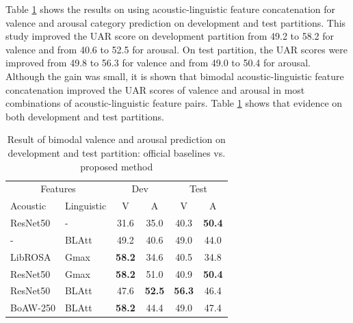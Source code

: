 Table \ref{tab:bimodal_result} shows the results on using acoustic-linguistic
feature concatenation for valence and arousal category prediction on
development and test partitions. This study improved the UAR score on
development partition from 49.2 to 58.2 for valence and from 40.6 to 52.5 for
arousal. On test partition, the UAR scores were improved from 49.8 to 56.3 for
valence and from 49.0 to 50.4 for arousal. Although the gain was small, it is
shown that bimodal acoustic-linguistic feature concatenation improved the UAR
scores of valence and arousal in most combinations of acoustic-linguistic
feature pairs. Table \ref{tab:bimodal_result} shows that evidence on both
development and test partitions.

\begin{table}
  \caption{Result of bimodal valence and arousal prediction on development and test partition: official baselines vs. proposed method}
  \label{tab:bimodal_result}
  \begin{center}
  \begin{tabular}{l l c c c c}
    \hline
\multicolumn{2}{c}{Features} & \multicolumn{2}{c}{Dev} &
\multicolumn{2}{c}{Test} \\
Acoustic  & Linguistic  & V & A & V & A \\
\hline \hline
ResNet50 \cite{Schuller}  & - & 31.6  & 35.0  & 40.3  & \textbf{50.4}\\
- & BLAtt \cite{Schuller} & 49.2  & 40.6  & 49.0  & 44.0 \\
LibROSA & Gmax  & \textbf{58.2} & 34.6  & 40.5  & 34.8 \\
ResNet50  & Gmax  & \textbf{58.2} & 51.0  & 40.9  & \textbf{50.4} \\
ResNet50  & BLAtt & 47.6  & \textbf{52.5} & \textbf{56.3} & 46.4 \\
BoAW-250  & BLAtt & \textbf{58.2} & 44.4  & 49.0  & 47.4 \\
\hline
  \end{tabular}
\end{center}
\end{table}


